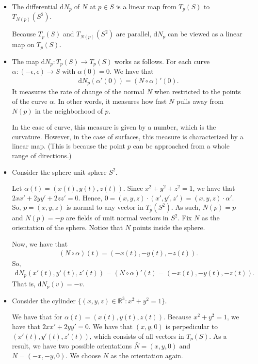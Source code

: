 \documentclass[10pt]{article}
\newcommand{\dee}{\mathrm{d}}
\newcommand{\ra}{\rightarrow}
\newcommand{\Real}{\mathbb{R}}
\begin{document}
\begin{itemize}
    \item The differential $\dee N_p$ of $N$ at $p \in S$ is a linear map from $T_p(S)$ to $T_{N(p)}(S^2)$.

    Because $T_p(S)$ and $T_{N(p)}(S^2)$ are parallel, $\dee N_p$ can be viewed as a linear map on $T_p(S)$.

    \item The map $\dee N_p: T_p(S) \ra T_p(S)$ works as follows. For each curve $\alpha : (-\epsilon, \epsilon) \ra S$ with $\alpha(0) = 0$. We have that
    \begin{align*}
      \dee N_p(\alpha'(0)) = (N \circ \alpha)'(0).
    \end{align*}
    It measures the rate of change of the normal $N$ when restricted to the points of the curve $\alpha$. In other words, it measures how fast $N$ pulls away from $N(p)$ in the neighborhood of $p$. 

    In the case of curve, this measure is given by a number, which is the curvature. However, in the case of surfaces, this measure is characterized by a linear map. (This is because the point $p$ can be approached from a whole range of directions.)

    \item Consider the sphere unit sphere $S^2$. 

    Let $\alpha(t) = (x(t), y(t), z(t))$. Since $x^2 + y^2 + z^2 = 1$, we have that $2xx' + 2yy' + 2zz' = 0$. Hence, $0 = (x, y, z) \cdot (x', y', z') = (x,y,z) \cdot \alpha'.$ So, $p = (x,y,z)$ is normal to any vector in $T_p(S^2)$. As such, $\bar N(p) = p$ and $N(p) = -p$ are fields of unit normal vectors in $S^2$. Fix $N$ as the orientation of the sphere. Notice that $N$ points inside the sphere.

    Now, we have that
    \begin{align*}
      (N \circ \alpha)(t) = (-x(t), -y(t), -z(t)).
    \end{align*}
    So,
    \begin{align*}
      \dee N_p(x'(t), y'(t), z'(t)) = (N \circ \alpha)'(t) = (-x(t), -y(t), -z(t)).
    \end{align*}
    That is, $\dee N_p(v) = -v$.

    \item Consider the cylinder $\{ (x,y,z) \in \Real^3 : x^2 + y^2 = 1 \}.$

    We have that for $\alpha(t) = (x(t), y(t), z(t))$. Because $x^2 + y^2 = 1$, we have that $2xx' + 2yy' = 0$. We have that $(x, y, 0)$ is perpedicular to $(x'(t), y'(t), z'(t))$, which consists of all vectors in $T_p(S)$. As a result, we have two possible orientations $\bar N = (x, y, 0)$ and $N = (-x, -y, 0).$ We choose $N$ as the orientation again.


\end{itemize}
\end{document}
